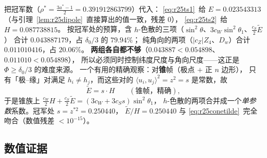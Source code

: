 \begin{remark}\label{rem:r25tension}
把冠军数（$\rho^*=\frac{3a^*-1}2=0.391912863799$）代入：
\eqref{eq:r25ts1}~给 $E=0.023543313$（与引理~\ref{lem:r25dipole}~直接算出的值一致，残差 $0$），
\eqref{eq:r25ts2}~给 $H=0.087738815$。
按冠军处的预算，含 $h$-色散的三项（$\sin^2\theta$、$3c_W\sin^2\theta_1$、$\frac{c_S}2\widetilde E$）
合计 $0.043887179$，占 $\delta_0/3$ 的 $79.94\%$；
纯角向的两项（$|c_Z|Z_4$、$D_w$）合计 $0.011010416$，占 $20.06\%$。
\textbf{两组各自都不够}（$0.043887<0.054898$、$0.011010<0.054898$），
所以必须同时控制纬度尺度与角向尺度——这正是 $\Phi\ge\delta_0/3$ 的难度来源。
一个有用的精确观察：对\textbf{锥}帧（极点 $+$ 正 $n$ 边形），
只有「极--缘」对满足 $h_i\ne h_j$，而这些对的 $\langle u_i,u_j\rangle^2=z^2=s$ 是常数，故
\begin{equation}\label{eq:r25conetilde}
\widetilde E=s\cdot H\qquad(\text{锥帧，精确}),
\end{equation}
于是锥族上 $\frac{c_W}2H+\frac{c_S}2\widetilde E=(3c_W+3c_Ss)\sin^2\theta_1$，
$h$-色散的两项合并成一个\emph{单参数}系数。冠军处 $s=z^{*2}=0.250440$，
$\widetilde E/H=0.250440$ 与 \eqref{eq:r25conetilde}~完全吻合（数值残差 $<10^{-15}$）。
\end{remark}

\subsection{数值证据}\label{sec:r25:num}

